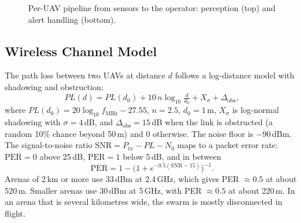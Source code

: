 \documentclass[10pt,letterpaper]{article}
\begin{document}
\begin{figure}[htbp]
\centering
{}
\caption{Per-UAV pipeline from sensors to the operator: perception (top) and alert handling (bottom).}\label{fig:pipeline}
\end{figure}

\subsection{Wireless Channel Model}\label{sec:channel}
The path loss between two UAVs at distance $d$ follows a log-distance model with shadowing and obstruction:
\begin{equation}
PL(d)=PL(d_0)+10\,n\log_{10}\tfrac{d}{d_0}+X_\sigma+\Delta_{\text{obs}},
\end{equation}
where $PL(d_0)=20\log_{10}f_{\text{MHz}}-27.55$, $n=2.5$, $d_0=1$\,m, $X_\sigma$ is log-normal shadowing with $\sigma=4$\,dB, and $\Delta_{\text{obs}}=15$\,dB when the link is obstructed (a random 10\% chance beyond 50\,m) and 0 otherwise. The noise floor is $-90$\,dBm. The signal-to-noise ratio $\text{SNR}=P_{tx}-PL-N_0$ maps to a packet error rate: $\text{PER}=0$ above 25\,dB, $\text{PER}=1$ below 5\,dB, and in between
\begin{equation}
\text{PER}=1-\bigl(1+e^{-0.5(\text{SNR}-15)}\bigr)^{-1}.
\end{equation}
Arenas of 2\,km or more use 33\,dBm at 2.4\,GHz, which gives PER $\approx0.5$ at about 520\,m. Smaller arenas use 30\,dBm at 5\,GHz, with PER $\approx0.5$ at about 220\,m. In an arena that is several kilometres wide, the swarm is mostly disconnected in flight.
\end{document}

